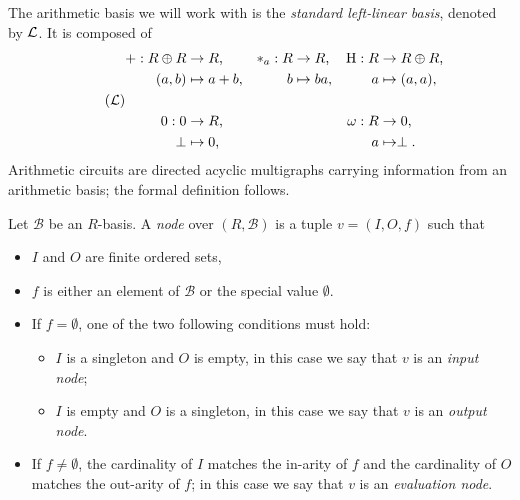   The arithmetic basis we will work with is
the \emph{standard left-linear
  basis}, denoted by $\mathcal{L}$.  It is composed of
\begin{equation}
  \label{eq:tbasis}
  \tag{$\Tbasis$}
  \begin{aligned}
    + : R\oplus R &\ra R\text{,}    & \rmul{a} : R &\ra R\text{,}     &  \hub : R &\ra R\oplus R\text{,}\\
      (a, b) &\mapsto a+b\text{,}   &           b &\mapsto ba\text{,} &         a &\mapsto (a,a)\text{,}\\ \\
    0 : 0 &\ra R\text{,}     &&& \omega : R &\ra 0\text{,} \\
     \bom &\mapsto 0\text{,} &&&          a &\mapsto \bom\text{.}
  \end{aligned}
\end{equation}
Arithmetic circuits are directed acyclic multigraphs carrying
information from an arithmetic basis; the formal definition follows.

\begin{definition}
  Let $\mathcal{B}$ be an $R$-basis. A \emph{node} over
  $(R,\mathcal{B})$ is a tuple $v=(I, O, f)$ such that
  \begin{itemize}
  \item $I$ and $O$ are finite ordered sets, 
  \item $f$ is either an element of $\mathcal{B}$ or the special value
    $\emptyset$.
  \item If $f=\emptyset$, one of the two following conditions must hold:
    \begin{itemize}
    \item $I$ is a singleton and $O$ is empty, in this case we say
      that $v$ is an \emph{input node};
    \item $I$ is empty and $O$ is a singleton, in this case we say
      that $v$ is an \emph{output node}.
    \end{itemize}
  \item If $f\ne\emptyset$, the cardinality of $I$ matches the
    in-arity of $f$ and the cardinality of $O$ matches the out-arity
    of $f$; in this case we say that $v$ is an
    \emph{evaluation node}.
  \end{itemize}
\end{definition}

